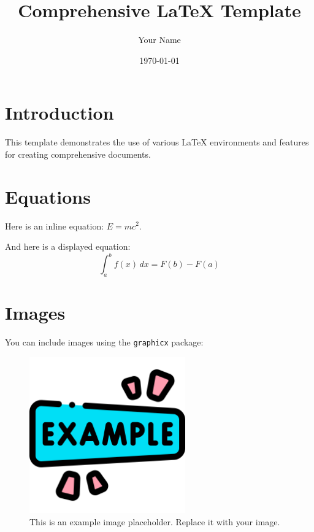 \documentclass[a4paper, 12pt]{article}
\title{Comprehensive LaTeX Template}
\author{Your Name}
\date{\today}
\begin{document}
\maketitle

\tableofcontents
\listoffigures
\listoftables

\newpage

\section{Introduction}
This template demonstrates the use of various LaTeX environments and features for creating comprehensive documents.

\section{Equations}
Here is an inline equation: $E = mc^2$. 

And here is a displayed equation:
\begin{equation}
\int_a^b f(x) \, dx = F(b) - F(a)
\end{equation}

\section{Images}
You can include images using the \texttt{graphicx} package:
\begin{figure}[h!]
    \centering
    \includegraphics[width=0.6\textwidth]{assets/example.png}
    \caption{This is an example image placeholder. Replace it with your image.}
    \label{fig:example}
\end{figure}
\end{document}
